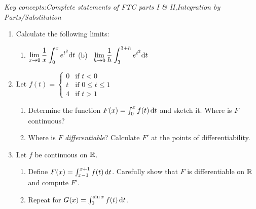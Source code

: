 
\clearpage


\begin{exercises}	
	\emph{Key concepts:\quad Complete statements of FTC parts I \& II,\quad Integration by Parts/Substitution}

	\begin{enumerate}
	  \item Calculate the following limits:
	  \begin{enumerate}
	    \item $\displaystyle\lim_{x\to 0}\frac 1x\int_0^xe^{t^2}{\mathrm{d} t}$ \qquad
	    (b) \ $\displaystyle\lim_{h\to 0}\frac 1h\int_3^{3+h}e^{t^2}{\mathrm{d} t}$
	  \end{enumerate}
	  
	  
	  \item Let $f(t)=
	  \begin{cases}
	  	0&\text{if }t<0\\
	  	t&\text{if }0\le t\le 1\\
	  	4&\text{if }t>1
	  \end{cases}$
	  \begin{enumerate}
	  	\item Determine the function $F(x)=\int_0^xf(t)\,{\mathrm{d} t}$ and sketch it. Where is $F$ continuous?
	    \item Where is $F$ \emph{differentiable}? Calculate $F'$ at the points of differentiability.
	  \end{enumerate}
	  
	  
	  \item Let $f$ be continuous on $\mathbb{R}$.
	  \begin{enumerate}
	    \item Define $F(x)=\int_{x-1}^{x+1}f(t)\,{\mathrm{d} t}$. Carefully show that $F$ is differentiable on $\mathbb{R}$ and compute $F'$.
	    \item Repeat for $G(x)=\int_0^{\sin x}f(t)\,{\mathrm{d} t}$.
	  \end{enumerate}
	  

\end{enumerate}
\end{exercises}
